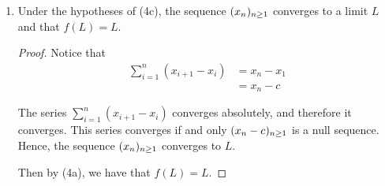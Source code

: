 \documentclass[12pt, letterpaper]{article}
\begin{document}
\begin{enumerate}[label=\bfseries4\alph*)]
Then $|x_n - x_{n+1}| \leq k^{n-1}C$ for every $n$ and the series 
$\sum_{i=1}^\infty (x_{i+1}-x_i)$ converges absolutely.

\begin{proof}
    We will induct on $n$

    We have $C = |x_1 - x_2|$ by definition. 

    Now suppose that $|x_n - x_{n+1}| \leq k^{n-1}C$. Then we have that 
    $|x_{n+1} - x_{n+2}| = |f(x_n) - f(x_{n+1})|$. Since $f$ is a $k$-contraction, 
    $|f(x_n) - f(x_{n+1})| \leq k|x_n-x_{n+1}| \leq k^n C$.

    Hence, $|x_n - x_{n+1}| \leq k^{n-1}C$ for every $n$.

    Since $|k| < 1$, the series $\sum_{i=1}^\infty k^{n-1}C$ is a convergent
    geometric series. 

    Since $0 \leq |x_n - x_{n+1}| \leq k^{n-1}C$ for all $n$, then by the 
    comparison test, $\sum_{i=1}^\infty (x_{i+1}-x_i)$ converges absolutely.
\end{proof}

\item Under the hypotheses of (4c), the sequence $(x_n)_{n\geq1}$ converges to a limit
$L$ and that $f(L)=L$.

\begin{proof}
    Notice that
    \begin{align*}
    \sum_{i=1}^n (x_{i+1}-x_i) &= x_n - x_1 \\
                               &= x_n - c
    \end{align*}

    The series $\sum_{i=1}^n (x_{i+1}-x_i)$ converges absolutely, and therefore
    it converges. This series converges if and only $(x_n-c)_{n \geq 1}$ is a 
    null sequence. Hence, the sequence $(x_n)_{n\geq1}$ converges to $L$.

    Then by (4a), we have that $f(L)=L$.
\end{proof}
\end{enumerate}
\end{document}
